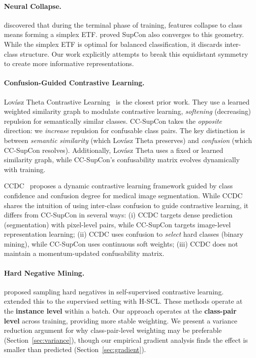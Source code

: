 \documentclass{article}
\begin{document}
\paragraph{Neural Collapse.}
\citet{papyan2020prevalence} discovered that during the terminal phase of training, features collapse to class means forming a simplex ETF. \citet{graf2021dissecting} proved SupCon also converges to this geometry. While the simplex ETF is optimal for balanced classification, it discards inter-class structure. Our work explicitly attempts to break this equidistant symmetry to create more informative representations.

\paragraph{Confusion-Guided Contrastive Learning.}
Lov\'{a}sz Theta Contrastive Learning~\citep{smyrnis2022lovasz} is the closest prior work. They use a learned weighted similarity graph to modulate contrastive learning, \emph{softening} (decreasing) repulsion for semantically similar classes. CC-SupCon takes the \emph{opposite} direction: we \emph{increase} repulsion for confusable class pairs. The key distinction is between \emph{semantic similarity} (which Lov\'{a}sz Theta preserves) and \emph{confusion} (which CC-SupCon resolves). Additionally, Lov\'{a}sz Theta uses a fixed or learned similarity graph, while CC-SupCon's confusability matrix evolves dynamically with training.

CCDC~\citep{chen2024dynamic} proposes a dynamic contrastive learning framework guided by class confidence and confusion degree for medical image segmentation. While CCDC shares the intuition of using inter-class confusion to guide contrastive learning, it differs from CC-SupCon in several ways: (i) CCDC targets dense prediction (segmentation) with pixel-level pairs, while CC-SupCon targets image-level representation learning; (ii) CCDC uses confusion to \emph{select} hard classes (binary mining), while CC-SupCon uses continuous soft weights; (iii) CCDC does not maintain a momentum-updated confusability matrix.

\paragraph{Hard Negative Mining.}
\citet{robinson2021contrastive} proposed sampling hard negatives in self-supervised contrastive learning. \citet{jiang2022supervised} extended this to the supervised setting with H-SCL. These methods operate at the \textbf{instance level} within a batch. Our approach operates at the \textbf{class-pair level} across training, providing more stable weighting. We present a variance reduction argument for why class-pair-level weighting may be preferable (Section~\ref{sec:variance}), though our empirical gradient analysis finds the effect is smaller than predicted (Section~\ref{sec:gradient}).
\end{document}
